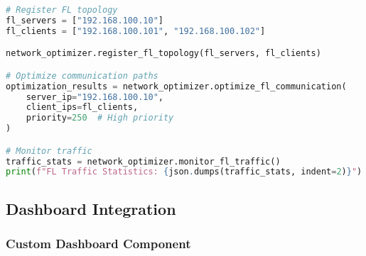 \begin{lstlisting}[language=python, caption=SDN Controller Integration]
# Register FL topology
fl_servers = ["192.168.100.10"]
fl_clients = ["192.168.100.101", "192.168.100.102"]

network_optimizer.register_fl_topology(fl_servers, fl_clients)

# Optimize communication paths
optimization_results = network_optimizer.optimize_fl_communication(
    server_ip="192.168.100.10",
    client_ips=fl_clients,
    priority=250  # High priority
)

# Monitor traffic
traffic_stats = network_optimizer.monitor_fl_traffic()
print(f"FL Traffic Statistics: {json.dumps(traffic_stats, indent=2)}")
\end{lstlisting}

\subsection{Dashboard Integration}

\subsubsection{Custom Dashboard Component}

